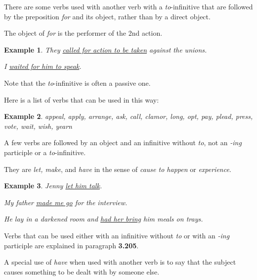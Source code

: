 \documentclass[oneside]{book}
\numberwithin{equation}{section}
\newtheorem{example}{Example}[section]
\begin{document}
%
\noindent{} There are some verbs used with another verb with a \textit{to}-infinitive that are followed by the preposition \textit{for} and its object, rather than by a direct object.

The object of \textit{for} is the performer of the 2nd action.
\begin{example}
    They \underline{called for action to be taken} against the unions.
    
    I \underline{waited for him to speak}.
\end{example}
Note that the \textit{to}-infinitive is often a passive one.

%
Here is a list of verbs that can be used in this way:
\begin{example}
    appeal, apply, arrange, ask, call, clamor, long, opt, pay, plead, press, vote, wait, wish, yearn
\end{example}
%
\noindent{} A few verbs are followed by an object and an infinitive without \textit{to}, not an \textit{-ing} participle or a \textit{to}-infinitive.

They are \textit{let, make}, and \textit{have} in the sense of \textit{cause to happen} or \textit{experience}.
\begin{example}
    Jenny \underline{let him talk}.
    
    My father \underline{made me go} for the interview.
    
    He lay in a darkened room and \underline{had her bring} him meals on trays.
\end{example}
Verbs that can be used either with an infinitive without \textit{to} or with an \textit{-ing} participle are explained in paragraph \textbf{3.205}.

%
\noindent{} A special use of \textit{have} when used with another verb is to say that the subject causes something to be dealt with by someone else.
\end{document}

